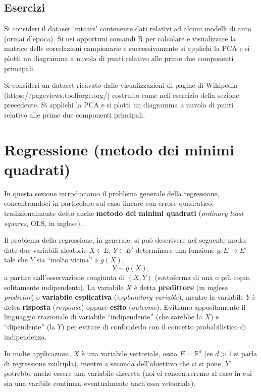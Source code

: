 \documentclass[
  italian,
  letterpaper,
]{book}
\newcommand{\R}{\mathbb{R}}
\theoremstyle{definition}
\theoremstyle{remark}
\begin{document}
\subsection{Esercizi}\label{esercizi-29}

Si consideri il dataset `mtcars' contenente dati relativi ad alcuni
modelli di auto (ormai d'epoca). Si usi opportuni comandi R per
calcolare e visualizzare la matrice delle correlazioni campionarie e
successivamente si applichi la PCA e si plotti un diagramma a nuvola di
punti relativo alle prime due componenti principali.

Si consideri un dataset ricavato dalle visualizzazioni di pagine di
Wikipedia (https://pageviews.toolforge.org/) costruito come
nell'esercizio della sezione precedente. Si applichi la PCA e si plotti
un diagramma a nuvola di punti relativo alle prime due componenti
principali.

\section{Regressione (metodo dei minimi
quadrati)}\label{sec-regressione}

In questa sezione introduciamo il problema generale della regressione,
concentrandoci in particolare sul caso lineare con errore quadratico,
tradizionalmente detto anche \textbf{metodo dei minimi quadrati}
(\emph{ordinary least squares}, OLS, in inglese).

Il problema della regressione, in generale, si può descrivere nel
seguente modo: date due variabili aleatorie \(X \in E\), \(Y \in E'\)
determinare una funzione \(g: E \to  E'\) tale che \(Y\) sia ``molto
vicina'' a \(g(X)\), \[ Y \sim g(X),\] a partire dall'osservazione
congiunta di \((X,Y)\) (sottoforma di una o più copie, solitamente
indipendenti). La variabile \(X\) è detta \textbf{predittore} (in
inglese \emph{predictor}) o \textbf{variabile esplicativa}
(\emph{explanatory variable}), mentre la variabile \(Y\) è detta
\textbf{risposta} (\emph{response}) oppure \textbf{esito}
(\emph{outcome}). Evitiamo appositamente il linguaggio trazionale di
variabile ``indipendente'' (che sarebbe la \(X\)) e ``dipendente'' (la
\(Y\)) per evitare di confonderlo con il concetto probabilistico di
indipendenza.

In molte applicazioni, \(X\) è una variabile vettoriale, ossia
\(E=\R^d\) (se \(d >1\) si parla di regressione multipla), mentre a
seconda dell'obiettivo che ci si pone, \(Y\) potrebbe anche essere una
variabile discreta (noi ci concentreremo al caso in cui sia una varibile
continua, eventualmente anch'essa vettoriale).
\end{document}
